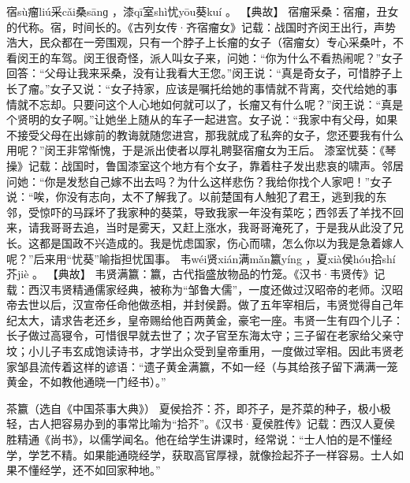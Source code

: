 \documentclass[12pt,UTF8]{ctexbook}
\begin{document}
宿sù瘤liú采cǎi桑sānɡ
，漆qī室shì忧yōu葵kuí
。
【典故】
宿瘤采桑：宿瘤，丑女的代称。宿，时间长的。《古列女传·齐宿瘤女》记载：战国时齐闵王出行，声势浩大，民众都在一旁围观，只有一个脖子上长瘤的女子（宿瘤女）专心采桑叶，不看闵王的车驾。闵王很奇怪，派人叫女子来，问她：“你为什么不看热闹呢？”女子回答：“父母让我来采桑，没有让我看大王您。”闵王说：“真是奇女子，可惜脖子上长了瘤。”女子又说：“女子持家，应该是嘱托给她的事情就不背离，交代给她的事情就不忘却。只要问这个人心地如何就可以了，长瘤又有什么呢？”闵王说：“真是个贤明的女子啊。”让她坐上随从的车子一起进宫。女子说：“我家中有父母，如果不接受父母在出嫁前的教诲就随您进宫，那我就成了私奔的女子，您还要我有什么用呢？”闵王非常惭愧，于是派出使者以厚礼聘娶宿瘤女为王后。
漆室忧葵：《琴操》记载：战国时，鲁国漆室这个地方有个女子，靠着柱子发出悲哀的啸声。邻居问她：“你是发愁自己嫁不出去吗？为什么这样悲伤？我给你找个人家吧！”女子说：“唉，你没有志向，太不了解我了。以前楚国有人触犯了君王，逃到我的东邻，受惊吓的马踩坏了我家种的葵菜，导致我家一年没有菜吃；西邻丢了羊找不回来，请我哥哥去追，当时是雾天，又赶上涨水，我哥哥淹死了，于是我从此没了兄长。这都是国政不兴造成的。我是忧虑国家，伤心而啸，怎么你以为我是急着嫁人呢？”后来用“忧葵”喻指担忧国事。
韦wéi贤xián满mǎn籝yíng
，夏xià侯hóu拾shí芥jiè
。
【典故】
韦贤满籝：籝，古代指盛放物品的竹笼。《汉书·韦贤传》记载：西汉韦贤精通儒家经典，被称为“邹鲁大儒”，一度还做过汉昭帝的老师。汉昭帝去世以后，汉宣帝任命他做丞相，并封侯爵。做了五年宰相后，韦贤觉得自己年纪太大，请求告老还乡，皇帝赐给他百两黄金，豪宅一座。韦贤一生有四个儿子：长子做过高寝令，可惜很早就去世了；次子官至东海太守；三子留在老家给父亲守坟；小儿子韦玄成饱读诗书，才学出众受到皇帝重用，一度做过宰相。因此韦贤老家邹县流传着这样的谚语：“遗子黄金满籝，不如一经（与其给孩子留下满满一笼黄金，不如教他通晓一门经书）。”

茶籝（选自《中国茶事大典》）
夏侯拾芥：芥，即芥子，是芥菜的种子，极小极轻，古人把容易办到的事常比喻为“拾芥”。《汉书·夏侯胜传》记载：西汉人夏侯胜精通《尚书》，以儒学闻名。他在给学生讲课时，经常说：“士人怕的是不懂经学，学艺不精。如果能通晓经学，获取高官厚禄，就像捡起芥子一样容易。士人如果不懂经学，还不如回家种地。”
\end{document}
